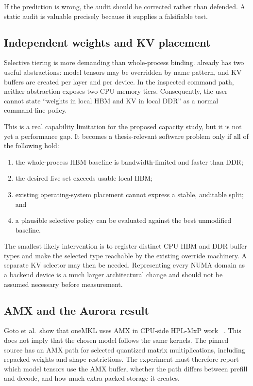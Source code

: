 If the prediction is wrong, the audit should be corrected rather than
defended.  A static audit is valuable precisely because it supplies a
falsifiable test.

\subsection{Independent weights and KV placement}

Selective tiering is more demanding than whole-process binding.
\lcpp{} already has two useful abstractions: model tensors may be
overridden by name pattern, and KV buffers are created per layer and per
device.  In the inspected command path, neither abstraction exposes two
CPU memory tiers.  Consequently, the user cannot state ``weights in
local HBM and KV in local DDR'' as a normal command-line policy.

This is a real capability limitation for the proposed capacity study,
but it is not yet a performance gap.  It becomes a thesis-relevant
software problem only if all of the following hold:

\begin{enumerate}
  \item the whole-process HBM baseline is bandwidth-limited and faster
        than DDR;
  \item the desired live set exceeds usable local HBM;
  \item existing operating-system placement cannot express a stable,
        auditable split; and
  \item a plausible selective policy can be evaluated against the best
        unmodified baseline.
\end{enumerate}

The smallest likely intervention is to register distinct CPU HBM and
DDR buffer types and make the selected type reachable by the existing
override machinery.  A separate KV selector may then be needed.
Representing every NUMA domain as a backend device is a much larger
architectural change and should not be assumed necessary before
measurement.

\subsection{AMX and the Aurora result}

Goto et al.\ show that oneMKL uses AMX in CPU-side HPL-MxP work
~\cite{goto2026aurorahpl}.  This does not imply that the chosen
\lcpp{} model follows the same kernels.  The pinned source has an AMX
path for selected quantized matrix multiplications, including repacked
weights and shape restrictions.  The experiment must therefore report
which model tensors use the AMX buffer, whether the path differs between
prefill and decode, and how much extra packed storage it creates.

